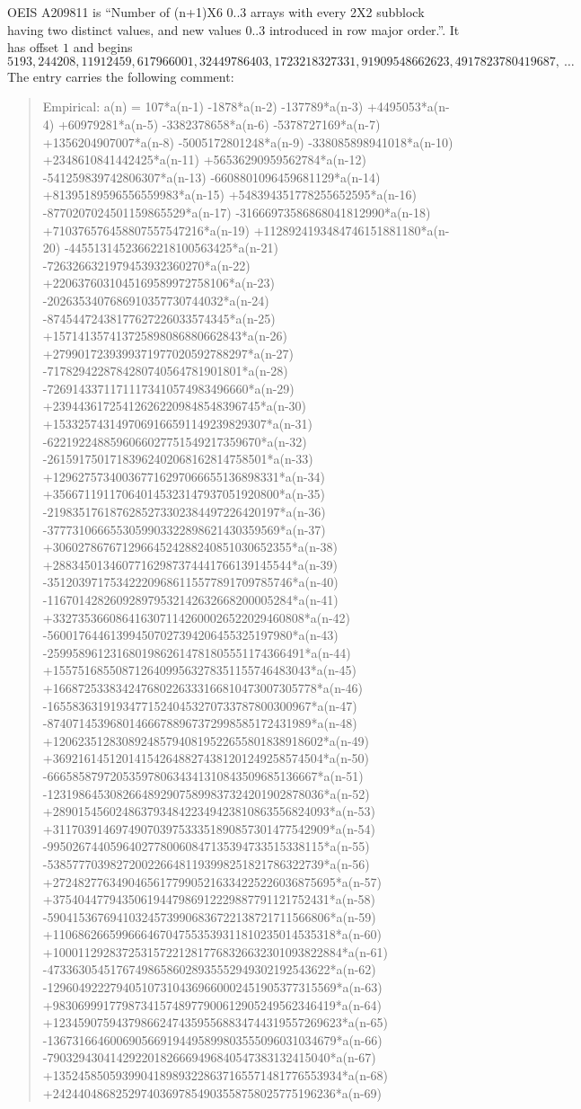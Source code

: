 \documentclass[11pt,a4paper]{article}
\theoremstyle{plain}
\theoremstyle{definition}
\begin{document}
OEIS A209811 is ``Number of (n+1)X6 0..3 arrays with every 2X2 subblock having two distinct values, and new values 0..3 introduced in row major order.''. It has offset $1$ and begins
\[
5193, 244208, 11912459, 617966001, 32449786403, 1723218327331, 91909548662623, 4917823780419687,\ \dots
\]
The entry carries the following comment:
\begin{quote}\small
Empirical: a(n) = 107*a(n-1) -1878*a(n-2) -137789*a(n-3) +4495053*a(n-4) +60979281*a(n-5) -3382378658*a(n-6) -5378727169*a(n-7) +1356204907007*a(n-8) -5005172801248*a(n-9) -338085898941018*a(n-10) +2348610841442425*a(n-11) +56536290959562784*a(n-12) -541259839742806307*a(n-13) -6608801096459681129*a(n-14) +81395189596556559983*a(n-15) +548394351778255652595*a(n-16) -8770207024501159865529*a(n-17) -31666973586868041812990*a(n-18) +710376576458807557547216*a(n-19) +1128924193484746151881180*a(n-20) -44551314523662218100563425*a(n-21) -7263266321979453932360270*a(n-22) +2206376031045169589972758106*a(n-23) -2026353407686910357730744032*a(n-24) -87454472438177627226033574345*a(n-25) +157141357413725898086880662843*a(n-26) +2799017239399371977020592788297*a(n-27) -7178294228784280740564781901801*a(n-28) -72691433711711173410574983496660*a(n-29) +239443617254126262209848548396745*a(n-30) +1533257431497069166591149239829307*a(n-31) -6221922488596066027751549217359670*a(n-32) -26159175017183962402068162814758501*a(n-33) +129627573400367716297066655136898331*a(n-34) +356671191170640145323147937051920800*a(n-35) -2198351761876285273302384497226420197*a(n-36) -3777310666553059903322898621430359569*a(n-37) +30602786767129664524288240851030652355*a(n-38) +28834501346077162987374441766139145544*a(n-39) -351203971753422209686115577891709785746*a(n-40) -116701428260928979532142632668200005284*a(n-41) +3327353660864163071142600026522029460808*a(n-42) -560017644613994507027394206455325197980*a(n-43) -25995896123168019862614781805551174366491*a(n-44) +15575168550871264099563278351155746483043*a(n-45) +166872533834247680226333166810473007305778*a(n-46) -165583631919347715240453270733787800300967*a(n-47) -874071453968014666788967372998585172431989*a(n-48) +1206235128308924857940819522655801838918602*a(n-49) +3692161451201415426488274381201249258574504*a(n-50) -6665858797205359780634341310843509685136667*a(n-51) -12319864530826648929075899837324201902878036*a(n-52) +28901545602486379348422349423810863556824093*a(n-53) +31170391469749070397533351890857301477542909*a(n-54) -99502674405964027780060847135394733515338115*a(n-55) -53857770398272002266481193998251821786322739*a(n-56) +272482776349046561779905216334225226036875695*a(n-57) +37540447794350619447986912229887791121752431*a(n-58) -590415367694103245739906836722138721711566806*a(n-59) +110686266599666467047553539311810235014535318*a(n-60) +1000112928372531572212817768326632301093822884*a(n-61) -473363054517674986586028935552949302192543622*a(n-62) -1296049222794051073104369660002451905377315569*a(n-63) +983069991779873415748977900612905249562346419*a(n-64) +1234590759437986624743595568834744319557269623*a(n-65) -1367316646006905669194495899803555096031034679*a(n-66) -790329430414292201826669496840547383132415040*a(n-67) +1352458505939904189893228637165571481776553934*a(n-68) +242440486825297403697854903558758025775196236*a(n-69) 
\end{quote}
\end{document}
